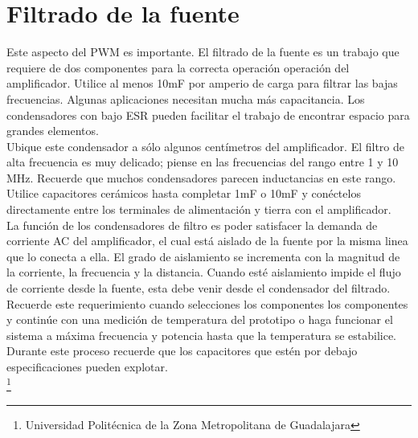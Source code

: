 \documentclass[12pt,a4paper]{article}
\begin{document}
\section{Filtrado de la fuente}
Este aspecto del PWM es importante. El filtrado de la fuente es un trabajo que requiere de dos componentes para la correcta operación operación del amplificador. Utilice al menos 10mF por amperio de carga para filtrar las bajas frecuencias. Algunas aplicaciones necesitan mucha más capacitancia. Los condensadores con bajo ESR pueden facilitar el trabajo de encontrar espacio para grandes elementos.\\
Ubique este condensador a sólo algunos centímetros del amplificador. El filtro de alta frecuencia es muy delicado; piense en las frecuencias del rango entre 1 y 10 MHz. Recuerde que muchos condensadores parecen inductancias en este rango. Utilice capacitores cerámicos hasta completar 1mF o 10mF y conéctelos directamente entre los terminales de alimentación y tierra con el amplificador.\\
La función de los condensadores de filtro es poder satisfacer la demanda de corriente AC del amplificador, el cual está aislado de la fuente por la misma linea que lo conecta a ella. El grado de aislamiento se incrementa con la magnitud de la corriente, la frecuencia y la distancia. Cuando esté aislamiento impide el flujo de corriente desde la fuente, esta debe venir desde el condensador del filtrado.\\
Recuerde este requerimiento cuando selecciones los componentes los componentes y continúe con una medición de temperatura del prototipo o haga funcionar el sistema a máxima frecuencia y potencia hasta que la temperatura se estabilice. Durante este proceso recuerde que los capacitores que estén por debajo especificaciones pueden explotar.\\

\footnote{Universidad Politécnica de la Zona Metropolitana de Guadalajara}

\newpage
\end{document}
